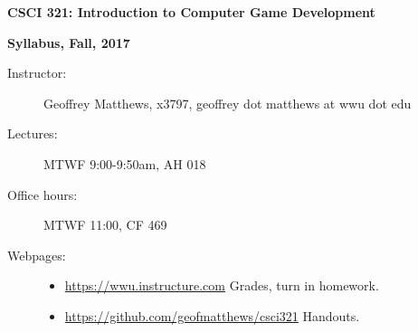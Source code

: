\documentclass{article}
\begin{document}
\centerline{\Large \bf CSCI 321: Introduction to Computer Game Development}

\centerline{\bf Syllabus, Fall, 2017}

\begin{description}

\item[Instructor:] Geoffrey Matthews, x3797,
 geoffrey dot matthews at wwu dot edu

\item[Lectures:] MTWF 9:00-9:50am, AH 018

\item[Office hours:] MTWF 11:00, CF 469


\item [Webpages:] \mbox{}\begin{itemize}
\item\url{https://wwu.instructure.com} Grades, turn in homework.
\item\url{https://github.com/geofmatthews/csci321} Handouts.
\end{itemize}



\end{description}
\end{document}
